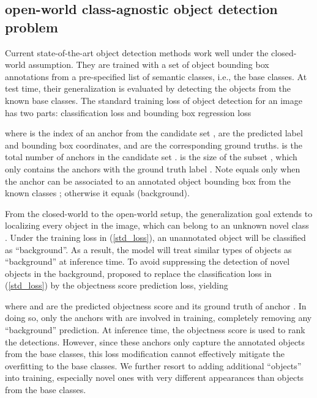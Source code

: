 \documentclass{article} \usepackage{iclr2023_conference,times}
\begin{document}
\subsection{open-world class-agnostic object detection problem}
Current state-of-the-art object detection methods work well under the closed-world assumption. They are trained with a set of object bounding box annotations  from a pre-specified list  of semantic classes, i.e., the base classes. At test time, their generalization is evaluated by detecting the objects from the known base classes. The standard training loss of object detection for an image  has two parts: classification loss and bounding box regression loss

where  is the index of an anchor from the candidate set ,  are the predicted label and bounding box coordinates, and  are the corresponding ground truths.  is the total number of anchors in the candidate set .  is the size of the subset , which only contains the anchors with the ground truth label . Note  equals  only when the anchor  can be associated to an annotated object bounding box from the known classes ; otherwise it equals  (background). 

From the closed-world to the open-world setup, the generalization goal extends to localizing every object in the image, which can belong to an unknown novel class . Under the training loss in (\ref{std_loss}), an unannotated object will be classified as ``background''. As a result, the model will treat similar types of objects as ``background'' at inference time. To avoid suppressing the detection of novel objects in the background, \citet{kim_learning_2021} proposed to replace the classification loss in (\ref{std_loss}) by the objectness score prediction loss, yielding

where  and  are the predicted objectness score and its ground truth of anchor . In doing so, only the anchors with  are involved in training, completely removing any ``background'' prediction. At inference time, the objectness score is used to rank the detections. However, since these anchors only capture the annotated objects from the base classes, this loss modification cannot effectively mitigate the overfitting to the base classes. We further resort to adding additional ``objects'' into training, especially novel ones with very different appearances than objects from the base classes.
\end{document}

